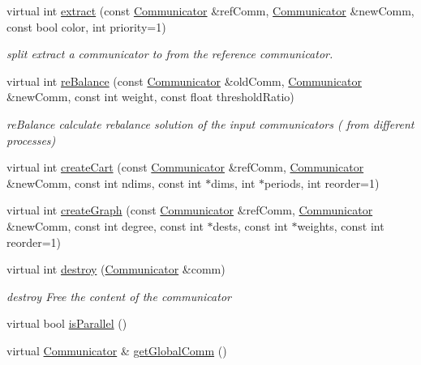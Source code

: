 \begin{DoxyCompactItemize}
virtual int \hyperlink{classHSF_1_1CommunicationManager_ae872cf2b678e8998fcb7b7dcc1a9b2d0}{extract} (const \hyperlink{classHSF_1_1Communicator}{Communicator} \&refComm, \hyperlink{classHSF_1_1Communicator}{Communicator} \&newComm, const bool color, int priority=1)
\begin{DoxyCompactList}\small\item\em split extract a communicator to from the reference communicator. \item\end{DoxyCompactList}\item 
virtual int \hyperlink{classHSF_1_1CommunicationManager_a23ed29de80835c5f413b2fefa2d98bdb}{reBalance} (const \hyperlink{classHSF_1_1Communicator}{Communicator} \&oldComm, \hyperlink{classHSF_1_1Communicator}{Communicator} \&newComm, const int weight, const float thresholdRatio)
\begin{DoxyCompactList}\small\item\em reBalance calculate rebalance solution of the input communicators ( from different processes) \item\end{DoxyCompactList}\item 
virtual int \hyperlink{classHSF_1_1CommunicationManager_a1128786fe9a8887c1e02f00bcabcd0a6}{createCart} (const \hyperlink{classHSF_1_1Communicator}{Communicator} \&refComm, \hyperlink{classHSF_1_1Communicator}{Communicator} \&newComm, const int ndims, const int $\ast$dims, int $\ast$periods, int reorder=1)
\item 
virtual int \hyperlink{classHSF_1_1CommunicationManager_a6740c20953c04b2283a830b8f1226d9f}{createGraph} (const \hyperlink{classHSF_1_1Communicator}{Communicator} \&refComm, \hyperlink{classHSF_1_1Communicator}{Communicator} \&newComm, const int degree, const int $\ast$dests, const int $\ast$weights, const int reorder=1)
\item 
virtual int \hyperlink{classHSF_1_1CommunicationManager_ab1ce47822ae286b8e08be0a796f3feea}{destroy} (\hyperlink{classHSF_1_1Communicator}{Communicator} \&comm)
\begin{DoxyCompactList}\small\item\em destroy Free the content of the communicator \item\end{DoxyCompactList}\item 
virtual bool \hyperlink{classHSF_1_1CommunicationManager_a1a8ea32f81aa56766552980fa3825127}{isParallel} ()
\item 
virtual \hyperlink{classHSF_1_1Communicator}{Communicator} \& \hyperlink{classHSF_1_1CommunicationManager_ac71fa06c7568af39df109ffa32a5c444}{getGlobalComm} ()

\end{DoxyCompactItemize}

